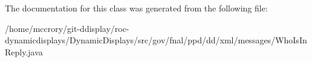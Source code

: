 The documentation for this class was generated from the following file\-:\begin{DoxyCompactItemize}
\item 
/home/mccrory/git-\/ddisplay/roc-\/dynamicdisplays/\-Dynamic\-Displays/src/gov/fnal/ppd/dd/xml/messages/Who\-Is\-In\-Reply.\-java\end{DoxyCompactItemize}
